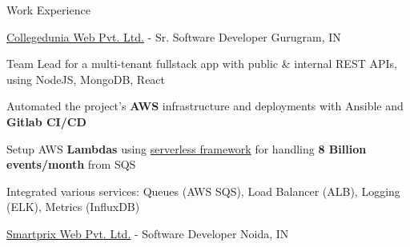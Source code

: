 \documentclass[../resume.tex]{subfiles}
\begin{document}
\begin{rSection}{Work Experience}
\begin{rSubsection}
    {\href{https://go.rohit.page/cd}{Collegedunia Web Pvt. Ltd.}}
    {  -  }
    {Sr. Software Developer}
    {Gurugram, IN}

    \item Team Lead for a multi-tenant fullstack app with public \& internal REST APIs, using NodeJS, MongoDB, React
    \item Automated the project's \textbf{AWS} infrastructure and deployments with Ansible and \textbf{Gitlab CI/CD}
    \item Setup AWS \textbf{Lambdas} using \href{https://www.serverless.com/}{serverless framework} for handling \textbf{8 Billion events/month} from SQS
    \item Integrated various services: Queues (AWS SQS), Load Balancer (ALB), Logging (ELK), Metrics (InfluxDB)

\end{rSubsection}

\begin{rSubsection}
    {\href{https://go.rohit.page/smpx}{Smartprix Web Pvt. Ltd.}}
    {  -  }
    {Software Developer}
    {Noida, IN}


\end{rSubsection}
\end{rSection}
\end{document}
